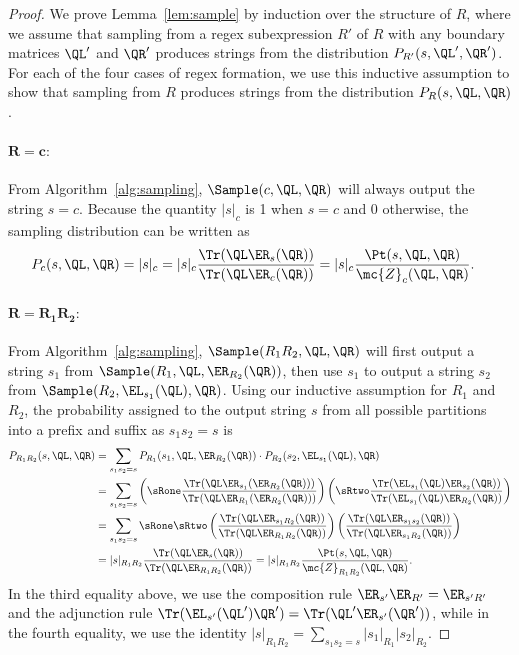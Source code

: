 \begin{proof}

We prove Lemma~\ref{lem:sample} by induction over the structure of $R$, where we assume that sampling from a regex subexpression $R'$ of $R$ with any boundary matrices $\QL'$ and $\QR'$ produces strings from the distribution $P_{R'}(s, \QL', \QR')$. For each of the four cases of regex formation, we use this inductive assumption to show that sampling from $R$ produces strings from the distribution $P_R(s, \QL, \QR)$.

\paragraph{$\mathbf{R = c:}$} From Algorithm~\ref{alg:sampling},
$\Sample(c, \QL, \QR)$ will always output the string $s = c$. Because the quantity $|s|_c$ is 1 when $s = c$ and 0 otherwise, the sampling distribution can be written as
%
\begin{align*}
    P_c(s, \QL, \QR) &= |s|_c = |s|_c \frac{\Tr(\QL \ER_s(\QR))}{\Tr(\QL \ER_c(\QR))} = |s|_c \frac{\Pt(s, \QL, \QR)}{\mc{Z}_c(\QL, \QR)}.
\end{align*}
   
\paragraph{$\mathbf{R = R_1 R_2:}$} From Algorithm~\ref{alg:sampling},
$\Sample(R_1 R_2, \QL, \QR)$ will first output a string $s_1$ from $\Sample(R_1, \QL, \ER_{R_2}(\QR))$, then use $s_1$ to output a string $s_2$ from $\Sample(R_2, \EL_{s_1}(\QL), \QR)$. Using our inductive assumption for $R_1$ and $R_2$, the probability assigned to the output string $s$ from all possible partitions into a prefix and suffix as $s_1 s_2 = s$ is
%
\begin{align*}
    P_{R_1 R_2}(s, \QL, \QR) &= \sum_{s_1 s_2 = s} P_{R_1}(s_1, \QL, \ER_{R_2}(\QR)) \cdot P_{R_2}(s_2, \EL_{s_1}(\QL), \QR) \\
    &= \sum_{s_1 s_2 = s} \left( \sRone \frac{\Tr(\QL \ER_{s_1}(\ER_{R_2}(\QR)))}{\Tr(\QL \ER_{R_1}(\ER_{R_2}(\QR)))} \right) \left( \sRtwo \frac{\Tr(\EL_{s_1}(\QL) \ER_{s_2}(\QR))}{\Tr(\EL_{s_1}(\QL) \ER_{R_2}(\QR))} \right) \\
    &= \sum_{s_1 s_2 = s} \sRone \sRtwo \left(\frac{\Tr(\QL \ER_{s_1 R_2}(\QR))}{\Tr(\QL \ER_{R_1 R_2}(\QR))}\right) \left(\frac{\Tr(\QL \ER_{s_1 s_2}(\QR))}{\Tr(\QL \ER_{s_1 R_2}(\QR))}\right) \\
    &= |s|_{R_1 R_2} \frac{\Tr(\QL \ER_{s}(\QR))}{\Tr(\QL \ER_{R_1 R_2}(\QR))} = |s|_{R_1 R_2} \frac{\Pt(s, \QL, \QR)}{\mc{Z}_{R_1 R_2}(\QL, \QR)}.
\end{align*}
%
In the third equality above, we use the composition rule $\ER_{s'}\ER_{R'} = \ER_{s' R'}$ and the adjunction rule $\Tr(\EL_{s'}(\QL') \QR') = \Tr(\QL' \ER_{s'}(\QR'))$, while in the fourth equality, we use the identity $|s|_{R_1 R_2} = \sum_{s_1 s_2 = s} |s_1|_{R_1} |s_2|_{R_2}$.


\end{proof}
